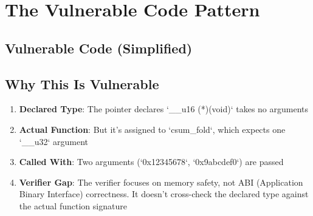 \section{The Vulnerable Code Pattern}

\subsection{Vulnerable Code (Simplified)}

\vspace{0.3cm}
\noindent
{}
\vspace{0.3cm}

\subsection{Why This Is Vulnerable}

\begin{enumerate}[label=\arabic*.]
  \item \textbf{Declared Type}: The pointer declares `\_\_u16 (*)(void)` takes no arguments
  \item \textbf{Actual Function}: But it's assigned to `csum\_fold`, which expects one `\_\_u32` argument
  \item \textbf{Called With}: Two arguments (`0x12345678`, `0x9abcdef0`) are passed
  \item \textbf{Verifier Gap}: The verifier focuses on memory safety, not ABI (Application Binary Interface) correctness. It doesn't cross-check the declared type against the actual function signature
\end{enumerate}

